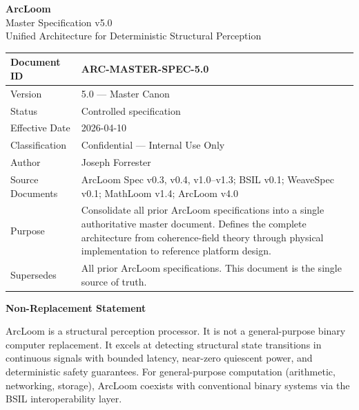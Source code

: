 \documentclass[11pt, a4paper]{report}
\begin{document}
\begin{titlepage}
\centering
{\Huge \textbf{ArcLoom}}\\[0.5cm]
{\LARGE Master Specification v5.0}\\[0.3cm]
{\Large Unified Architecture for Deterministic Structural Perception}\\[1cm]

\renewcommand{\arraystretch}{1.15}
\begin{tabularx}{\textwidth}{|p{}|Y|}
\hline
Document ID & ARC-MASTER-SPEC-5.0 \\\hline
Version & 5.0 --- Master Canon \\\hline
Status & Controlled specification \\\hline
Effective Date & 2026-04-10 \\\hline
Classification & Confidential --- Internal Use Only \\\hline
Author & Joseph Forrester \\\hline
Source Documents & ArcLoom Spec v0.3, v0.4, v1.0--v1.3; BSIL v0.1;
                   WeaveSpec v0.1; MathLoom v1.4; ArcLoom v4.0 \\\hline
Purpose & Consolidate all prior ArcLoom specifications into a single
          authoritative master document. Defines the complete architecture
          from coherence-field theory through physical implementation to
          reference platform design. \\\hline
Supersedes & All prior ArcLoom specifications. This document is the
             single source of truth. \\\hline
\end{tabularx}

\vfill
{\large \textbf{Non-Replacement Statement}}\\[0.2cm]
\parbox{0.93\textwidth}{ArcLoom is a structural perception processor.
It is not a general-purpose binary computer replacement. It excels at
detecting structural state transitions in continuous signals with bounded
latency, near-zero quiescent power, and deterministic safety guarantees.
For general-purpose computation (arithmetic, networking, storage), ArcLoom
coexists with conventional binary systems via the BSIL interoperability
layer.}
\vfill
\end{titlepage}

\tableofcontents
\clearpage

\end{document}
